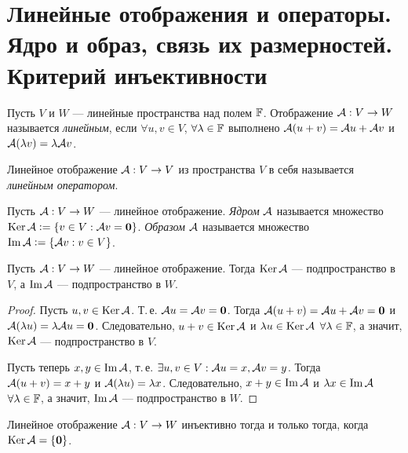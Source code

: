 \section{Линейные отображения и операторы. Ядро и образ, связь их размерностей. Критерий инъективности}

\begin{definition}
    Пусть $V$ и $W$ --- линейные пространства над полем $\mathbb{F}$. Отображение $\mathcal{A}: V \to W$ называется \textit{линейным}, если $\forall u, v \in V$, $\forall \lambda \in \mathbb{F}$ выполнено $\mathcal{A}(u + v) = \mathcal{A} u + \mathcal{A} v$ и $\mathcal{A}(\lambda v) = \lambda\mathcal{A} v$.
\end{definition}

\begin{definition}
    Линейное отображение $\mathcal{A}: V \to V$ из пространства $V$ в себя называется \textit{линейным оператором}.
\end{definition}

\begin{definition}
    Пусть $\mathcal{A}: V \to W$ --- линейное отображение. \textit{Ядром} $\mathcal{A}$ называется множество $\operatorname{Ker}\mathcal{A} \vcentcolon = \{v \in V : \mathcal{A} v = \boldsymbol{0}\}$. \textit{Образом} $\mathcal{A}$ называется множество $\operatorname{Im} \mathcal{A} \vcentcolon = \{\mathcal{A} v : v \in V\}$.
\end{definition}

\begin{proposal}
    Пусть $\mathcal{A}: V \to W$ --- линейное отображение. Тогда $\operatorname{Ker} \mathcal{A}$ --- подпространство в $V$, а $\operatorname{Im}\mathcal{A}$ --- подпространство в $W$.
\end{proposal}

\begin{proof}
    Пусть $u, v \in \operatorname{Ker}\mathcal{A}$. Т.\,е. $\mathcal{A} u = \mathcal{A} v = \boldsymbol{0}$. Тогда $\mathcal{A}(u + v) = \mathcal{A} u + \mathcal{A} v = \boldsymbol{0}$ и $\mathcal{A}(\lambda u) = \lambda\mathcal{A} u = \boldsymbol{0}$. Следовательно, $u + v \in \operatorname{Ker}\mathcal{A}$ и $\lambda u \in \operatorname{Ker} \mathcal{A}$ $\forall \lambda \in \mathbb{F}$, а значит, $\operatorname{Ker}\mathcal{A}$ --- подпространство в $V$.

    Пусть теперь $x, y \in \operatorname{Im}\mathcal{A}$, т.\,е. $\exists u, v \in V: \mathcal{A} u = x, \mathcal{A} v = y$. Тогда $\mathcal{A}(u + v) = x + y$ и $\mathcal{A}(\lambda u) = \lambda x$. Следовательно, $x + y \in \operatorname{Im}\mathcal{A}$ и $\lambda x \in \operatorname{Im}\mathcal{A}$ $\forall \lambda \in \mathbb{F}$, а значит, $\operatorname{Im}\mathcal{A}$ --- подпространство в $W$.
\end{proof}

\begin{lemma}
    Линейное отображение $\mathcal{A}: V \to W$ инъективно тогда и только тогда, когда $\operatorname{Ker}\mathcal{A} = \{\boldsymbol{0}\}$.
\end{lemma}

